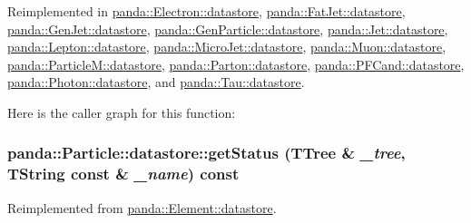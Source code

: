 Reimplemented in \hyperlink{structpanda_1_1Electron_1_1datastore_a82e74b804ecc9c1a138d5c3fcd6ef3a3}{panda::Electron::datastore}, \hyperlink{structpanda_1_1FatJet_1_1datastore_ae981e60d6fc142e3bbb4730a8a856fa7}{panda::FatJet::datastore}, \hyperlink{structpanda_1_1GenJet_1_1datastore_a2b1e39eb4f994f496aa013aaf82998c4}{panda::GenJet::datastore}, \hyperlink{structpanda_1_1GenParticle_1_1datastore_afe415117bf9f06e163aff5e341c9ef00}{panda::GenParticle::datastore}, \hyperlink{structpanda_1_1Jet_1_1datastore_a606415eee51c1a38fc0613f3b2946d1e}{panda::Jet::datastore}, \hyperlink{structpanda_1_1Lepton_1_1datastore_a527515ee96020a4aaef41d9de157c131}{panda::Lepton::datastore}, \hyperlink{structpanda_1_1MicroJet_1_1datastore_a03473e3dcba5abe73c123ce2c1d3292c}{panda::MicroJet::datastore}, \hyperlink{structpanda_1_1Muon_1_1datastore_aed9de75b6fb1e71671aa8a5b00862ace}{panda::Muon::datastore}, \hyperlink{structpanda_1_1ParticleM_1_1datastore_a85c4ce11f1d7c6944a525ad2488880aa}{panda::ParticleM::datastore}, \hyperlink{structpanda_1_1Parton_1_1datastore_a37d5d064962d581ebccadf6a683b9dc6}{panda::Parton::datastore}, \hyperlink{structpanda_1_1PFCand_1_1datastore_ac7084e2d45811f6909e8c65c20941107}{panda::PFCand::datastore}, \hyperlink{structpanda_1_1Photon_1_1datastore_a255374780b23e06a1fd24235847c77de}{panda::Photon::datastore}, and \hyperlink{structpanda_1_1Tau_1_1datastore_af651d3ae362a4a6d99b1bff788accca3}{panda::Tau::datastore}.

Here is the caller graph for this function:\hypertarget{structpanda_1_1Particle_1_1datastore_a09e5a80068f06d0d2118c2596258b8e3}{
\subsubsection[{getStatus}]{ panda::Particle::datastore::getStatus (TTree \& {\em \_\-tree}, \/  TString const \& {\em \_\-name}) const}}
\label{structpanda_1_1Particle_1_1datastore_a09e5a80068f06d0d2118c2596258b8e3}


Reimplemented from \hyperlink{structpanda_1_1Element_1_1datastore_a9f9eb1f7611bc73f10a010a149d17a15}{panda::Element::datastore}.

